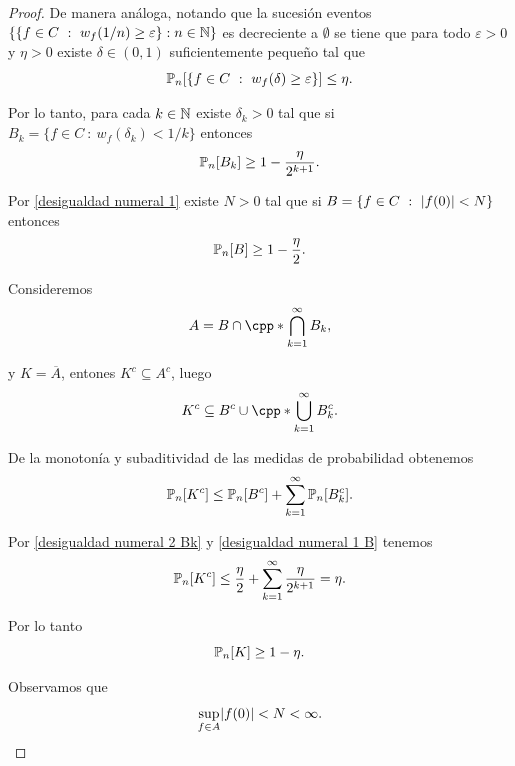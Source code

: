 \documentclass[12pt,oneside]{book}
\numberwithin{equation}{chapter}
\begin{document}
\begin{proof}
    De manera análoga, notando que la sucesión eventos $\{\{f\in C\ :\ w_f(1/n)\geq \varepsilon\}: n\in\N\}$ es decreciente a $\emptyset$ se tiene que para todo $\varepsilon>0$ y $\eta>0$ existe $\delta\in (0,1)$ suficientemente pequeño tal que
    \begin{equation*}
    \PP_n[\{f\in C\ :\ w_f(\delta)\geq \varepsilon\}]\leq \eta.
    \end{equation*}
    
    Por lo tanto, para cada $k\in\N$ existe $\delta_k>0$ tal que si  $B_k=\{f\in C\ :\ w_f(\delta_k)<1/k\}$ entonces
    \begin{equation}
    \label{desigualdad numeral 2 Bk}
    \PP_n[B_k]\geq 1-\frac{\eta}{2^{k+1}}.
    \end{equation}
    
    Por  \eqref{desigualdad numeral 1} existe $N>0$ tal que si $B=\{f\in C\ :\ \lvert f(0)\rvert< N\}$ entonces
    \begin{equation}
    \label{desigualdad numeral 1 B}
    \PP_n[B]\geq 1-\frac{\eta}{2}.
    \end{equation}
    
    Consideremos
    \begin{equation*}
    A=B\cap \cpp*{\bigcap_{k=1}^{\infty}B_k},
    \end{equation*}
    
    y $K=\overline{A}$, entones $K^c\subseteq A^c$, luego 
    \begin{equation*}
    K^c\subseteq B^c\cup \cpp*{\bigcup_{k=1}^{\infty}B_k^c}.
    \end{equation*}
    
    De la monotonía y subaditividad de las medidas de probabilidad obtenemos
    \begin{align*}
    \PP_n[K^c]\leq \PP_n[B^c]+\sum_{k=1}^{\infty}\PP_n[B_k^c].
    \end{align*}
    
    Por \eqref{desigualdad numeral 2 Bk} y \eqref{desigualdad numeral 1 B} tenemos
    \begin{equation*}
    \PP_n[K^c]\leq\frac{\eta}{2}+\sum_{k=1}^{\infty}\frac{\eta}{2^{k+1}}=\eta.
    \end{equation*}
    
    Por lo tanto 
    \begin{equation}
    \label{tension condicion suficiente}
    \PP_n[K]\geq 1-\eta.
    \end{equation}
    
    Observamos que 
    \begin{equation*}
    \sup_{f\in A}\lvert f(0)\rvert<N<\infty.
    \end{equation*}
    

\end{proof}
\end{document}
